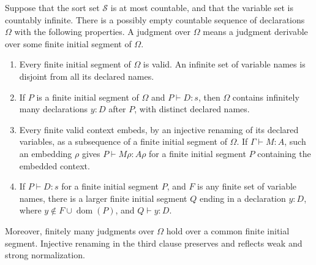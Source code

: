 \begin{lemma}\label{pts:saturated-context}
Suppose that the sort set $\mathcal S$ is at most countable, and that
the variable set is countably infinite.  There is a possibly empty
countable sequence of declarations $\Omega$ with the following
properties.  A judgment over $\Omega$ means a judgment derivable over
some finite initial segment of $\Omega$.
\begin{enumerate}
\item Every finite initial segment of $\Omega$ is valid.  An infinite
set of variable names is disjoint from all its declared names.
\item If $P$ is a finite initial segment of $\Omega$ and
$P\vdash D:s$, then $\Omega$ contains infinitely many declarations
$y:D$ after $P$, with distinct declared names.
\item Every finite valid context embeds, by an injective renaming of
its declared variables, as a subsequence of a finite initial segment
of $\Omega$.  If $\Gamma\vdash M:A$, such an embedding $\rho$ gives
$P\vdash M\rho:A\rho$ for a finite initial segment $P$ containing the
embedded context.
\item If $P\vdash D:s$ for a finite initial segment $P$, and $F$ is any
finite set of variable names, there is a larger finite initial segment
$Q$ ending in a declaration $y:D$, where
$y\notin F\cup\operatorname{dom}(P)$, and $Q\vdash y:D$.
\end{enumerate}
Moreover, finitely many judgments over $\Omega$ hold over a common
finite initial segment.  Injective renaming in the third clause
preserves and reflects weak and strong normalization.
\end{lemma}

